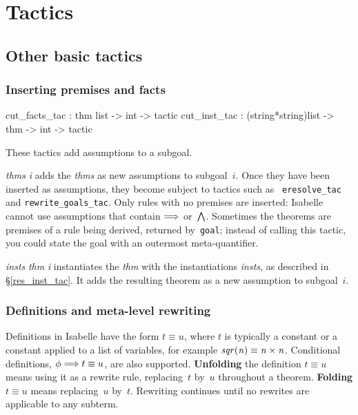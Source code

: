 
\chapter{Tactics} \label{tactics}

\section{Other basic tactics}

\subsection{Inserting premises and facts}\label{cut_facts_tac}
\begin{ttbox} 
cut_facts_tac : thm list -> int -> tactic
cut_inst_tac  : (string*string)list -> thm -> int -> tactic
\end{ttbox}
These tactics add assumptions to a subgoal.
\begin{ttdescription}
\item[\ttindexbold{cut_facts_tac} {\it thms} {\it i}] 
  adds the {\it thms} as new assumptions to subgoal~$i$.  Once they have
  been inserted as assumptions, they become subject to tactics such as {\tt
    eresolve_tac} and {\tt rewrite_goals_tac}.  Only rules with no premises
  are inserted: Isabelle cannot use assumptions that contain $\Longrightarrow$
  or~$\bigwedge$.  Sometimes the theorems are premises of a rule being
  derived, returned by~{\tt goal}; instead of calling this tactic, you
  could state the goal with an outermost meta-quantifier.

\item[\ttindexbold{cut_inst_tac} {\it insts} {\it thm} {\it i}]
  instantiates the {\it thm} with the instantiations {\it insts}, as
  described in {\S}\ref{res_inst_tac}.  It adds the resulting theorem as a
  new assumption to subgoal~$i$. 

\end{ttdescription}


\subsection{Definitions and meta-level rewriting} \label{sec:rewrite_goals}

Definitions in Isabelle have the form $t\equiv u$, where $t$ is typically a
constant or a constant applied to a list of variables, for example $\it
sqr(n)\equiv n\times n$.  Conditional definitions, $\phi\Longrightarrow t\equiv u$,
are also supported.  {\bf Unfolding} the definition ${t\equiv u}$ means using
it as a rewrite rule, replacing~$t$ by~$u$ throughout a theorem.  {\bf
Folding} $t\equiv u$ means replacing~$u$ by~$t$.  Rewriting continues until
no rewrites are applicable to any subterm.


